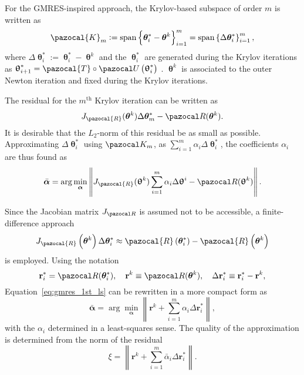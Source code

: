 
For the GMRES-inspired approach, the Krylov-based subspace of order $m$ is written as
\begin{equation}
\pazocal{K}_{m}:=\operatorname{span}\left\{\boldsymbol{\theta}^{*}_i-\boldsymbol{\theta}^{k}\right\}_{i=1}^{m}=\operatorname{span}\left\{\Delta \boldsymbol{\theta}^*_{i}\right\}_{i=1}^{m},
\end{equation}
where $\Delta \bm{\uptheta}^*_{i}:=\bm{\uptheta}^*_{i}-\bm{\uptheta}^{k}$ and the $\bm{\uptheta}^*_{i}$ are generated during the Krylov iterations as $\bm{\uptheta}^*_{i+1}=\pazocal{T} \circ \pazocal U\left(\bm{\uptheta}^*_{i}\right)$ . $\bm{\uptheta}^{k}$ is associated to the outer Newton iteration and fixed during the Krylov iterations.

The residual for the $m^\mathrm{th}$ Krylov iteration can be written as
\begin{equation}
J_\pazocal{R}(\boldsymbol \theta^k)\Delta\boldsymbol \theta^*_m - \pazocal R(\boldsymbol \theta^k).
\end{equation}
It is desirable that the $L_2$-norm of this residual be as small as possible.
Approximating $\Delta \bm \uptheta^*_i$ using $\pazocal K_m$, as $\sum_{i=1}^m \alpha_i \Delta \bm \uptheta^*_i$, the coefficients $\alpha_i$ are thus found as
\begin{equation} \label{eq:gmres_1st_ls}
\bar{\boldsymbol \alpha} = \arg\min_{\boldsymbol\alpha} \left\|J_\pazocal{R}(\bm \uptheta^k)\sum_{i=1}^m \alpha_i \Delta\bm \uptheta^i - \pazocal R(\bm \uptheta^k)\right\|.
\end{equation}

Since the Jacobian matrix $J_{\pazocal R}$ is assumed not to be accessible, a finite-difference approach
\begin{equation}
J_{\pazocal{R}}\left(\boldsymbol{\theta}^{k}\right) \Delta \boldsymbol{\theta}^*_{i} \approx \pazocal{R}\left(\boldsymbol{\theta}^*_{i}\right)-\pazocal{R}\left(\boldsymbol{\theta}^{k}\right)
\end{equation}
is employed.
Using the notation
\begin{equation}
\mathbf r^*_i = \pazocal R(\boldsymbol \theta^*_i),\quad
\mathbf r^k \equiv  \pazocal R(\boldsymbol \theta^k),\quad
\Delta \mathbf r_i^* \equiv \mathbf r_i^* - \mathbf r^k,
\end{equation}
Equation~\eqref{eq:gmres_1st_ls} can be rewritten in a more compact form as
\begin{equation} \label{eq:gmres_ls_condition}
\bar{\boldsymbol \alpha} = \arg\min_{\boldsymbol \alpha} \left\|\mathbf r^k+\sum_{i=1}^m\alpha_i\Delta\mathbf r^*_i\right\|,
\end{equation}
with the $\alpha_i$ determined in a least-squares sense.
The quality of the approximation is determined from the norm of the residual
\begin{equation} \label{eq:gmres_residual}
\xi=\left\|\boldsymbol{r}^{k}+\sum_{i=1}^{m} \bar{\alpha}_{i} \Delta \boldsymbol{r}^*_{i}\right\|.
\end{equation}

